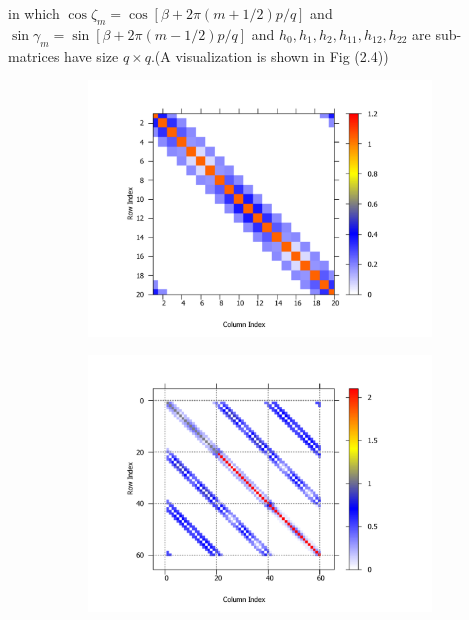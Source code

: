 \documentclass{report}
\begin{document}
in which $\cos \zeta_{m} = \cos \left[\beta + 2 \pi (m + 1/2)p / q\right]$ and $\sin \gamma_{m} = \sin \left[\beta + 2 \pi (m - 1/2)p / q\right]$ and $h_{0},h_{1},h_{2},h_{11},h_{12},h_{22}$ are sub-matrices have size $q \times q$.(A visualization is shown in Fig (2.4))
\begin{figure}[htb]
	\centering
	\begin{subfigure}[b]{0.495\textwidth}
		\centering
		\includegraphics[width=1.0\textwidth,height=0.9\linewidth]{pic/matrix_1band_h0.pdf}
		\label{fig:3 band matrix}
	\end{subfigure}
	\begin{subfigure}[b]{0.495\textwidth}
		\centering
		\includegraphics[width=1.0\textwidth,height=0.9\linewidth]{pic/matrix_3band.pdf}

\end{subfigure}
\end{figure}
\end{document}
